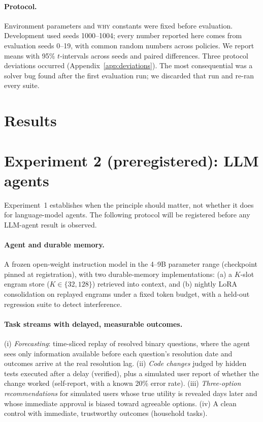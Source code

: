 \documentclass[11pt]{article}
\newcommand{\WHY}{\textsc{why}}
\begin{document}
\paragraph{Protocol.} Environment parameters and \WHY{} constants were fixed before evaluation. Development used seeds 1000--1004; every number reported here comes from evaluation seeds 0--19, with common random numbers across policies. We report means with 95\% $t$-intervals across seeds and paired differences. Three protocol deviations occurred (Appendix~\ref{app:deviations}). The most consequential was a solver bug found after the first evaluation run; we discarded that run and re-ran every suite.

\section{Results}
\label{sec:results}


\section{Experiment 2 (preregistered): LLM agents}
\label{sec:prereg}

Experiment~1 establishes when the principle should matter, not whether it does for language-model agents. The following protocol will be registered before any LLM-agent result is observed.

\paragraph{Agent and durable memory.} A frozen open-weight instruction model in the 4--9B parameter range (checkpoint pinned at registration), with two durable-memory implementations: (a) a $K$-slot engram store ($K\in\{32,128\}$) retrieved into context, and (b) nightly LoRA consolidation on replayed engrams under a fixed token budget, with a held-out regression suite to detect interference.

\paragraph{Task streams with delayed, measurable outcomes.} (i) \emph{Forecasting}: time-sliced replay of resolved binary questions, where the agent sees only information available before each question's resolution date and outcomes arrive at the real resolution lag. (ii) \emph{Code changes} judged by hidden tests executed after a delay (verified), plus a simulated user report of whether the change worked (self-report, with a known 20\% error rate). (iii) \emph{Three-option recommendations} for simulated users whose true utility is revealed days later and whose immediate approval is biased toward agreeable options. (iv) A clean control with immediate, trustworthy outcomes (household tasks).
\end{document}
